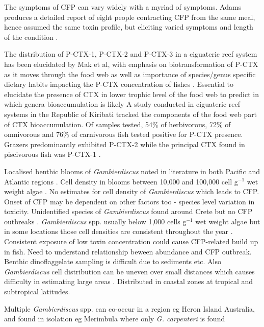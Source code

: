 \documentclass[12pt]{article}
\begin{document}
The symptoms of CFP can vary widely with a myriad of symptoms. Adams produces a detailed report of eight people contracting CFP from the same meal, hence assumed the same toxin profile, but eliciting varied symptoms and length of the condition \cite{adams1993outbreak}.


The distribution of P-CTX-1, P-CTX-2 and P-CTX-3 in a ciguateric reef system has been elucidated by Mak et al, with emphasis on biotransformation of P-CTX as it moves through the food web as well as importance of species/genus specific dietary habits impacting the P-CTX concentration of fishes \cite{mak2013pacific}.
Essential to elucidate the presence of CTX in lower trophic level of the food web to predict in which genera bioaccumulation is likely \cite{mak2013pacific}
A study conducted in ciguateric reef systems in the Republic of Kiribati tracked the components of the food web part of CTX bioaccumulation. Of samples tested, 54\% of herbivorous, 72\% of omnivorous and 76\% of carnivorous fish tested positive for P-CTX presence. Grazers predominantly exhibited P-CTX-2 while the principal CTX found in piscivorous fish was P-CTX-1 \cite{mak2013pacific}.

Localised benthic blooms of \emph{Gambierdiscus} noted in literature in both Pacific and Atlantic regions \cite{nakajima1981toxicity,withers1984ciguatera,chinain1999seasonal,darius2007ciguatera}.
Cell density in blooms between 10,000 and 100,000 cell g$^{-1}$ wet weight algae \cite{litaker2010global}. No estimates for cell density of \emph{Gambierdiscus} which leads to CFP. Onset of CFP may be dependent on other factors too - species level variation in toxicity. Unidentified species of \emph{Gambierdiscus} found around Crete but no CFP outbreaks \cite{caillaud2010update}.
\emph{Gambierdiscus} spp. usually below 1,000 cells g$^{-1}$ wet weight algae \cite{litaker2010global} but in some locations those cell densities are consistent throughout the year \cite{chinain1999seasonal}.
Consistent exposure of low toxin concentration could cause CFP-related build up in fish. Need to understand relationship beween abundance and CFP outbreak. Benthic dinoflaggelate sampling is difficult due to sediments etc. Also \emph{Gambierdiscus} cell distribution can be uneven over small distances which causes difficulty in estimating large areas \cite{lobel1988assessment,ballantine1988population,litaker2010global}.
Distributed in coastal zones at tropical and subtropical latitudes.


Multiple \emph{Gambierdiscus} spp. can co-occur in a region eg Heron Island Australia, and found in isolation eg Merimbula where only \emph{G. carpenteri} is found %
\end{document}
